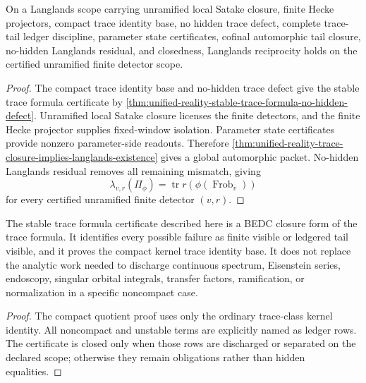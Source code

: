 \begin{theorem}
\label{thm:unified-reality-bedc-langlands-trace-closure}
On a Langlands scope carrying unramified local Satake closure, finite
Hecke projectors, compact trace identity base, no hidden trace defect,
complete trace-tail ledger discipline, parameter state certificates,
cofinal automorphic tail closure, no-hidden Langlands residual, and
closedness, Langlands reciprocity holds on the certified unramified
finite detector scope.
\end{theorem}
\begin{proof}
The compact trace identity base and no-hidden trace defect give the
stable trace formula certificate by
\autoref{thm:unified-reality-stable-trace-formula-no-hidden-defect}.
Unramified local Satake closure licenses the finite detectors, and the
finite Hecke projector supplies fixed-window isolation. Parameter state
certificates provide nonzero parameter-side readouts. Therefore
\autoref{thm:unified-reality-trace-closure-implies-langlands-existence}
gives a global automorphic packet. No-hidden Langlands residual removes
all remaining mismatch, giving
$$
\lambda_{v,r}(\Pi_\phi)
=
\operatorname{tr}r(\phi(\operatorname{Frob}_v))
$$
for every certified unramified finite detector $(v,r)$.
\end{proof}

\begin{theorem}
\label{thm:unified-reality-stable-trace-certificate-boundary}
The stable trace formula certificate described here is a BEDC closure
form of the trace formula. It identifies every possible failure as
finite visible or ledgered tail visible, and it proves the compact
kernel trace identity base. It does not replace the analytic work needed
to discharge continuous spectrum, Eisenstein series, endoscopy, singular
orbital integrals, transfer factors, ramification, or normalization in a
specific noncompact case.
\end{theorem}
\begin{proof}
The compact quotient proof uses only the ordinary trace-class kernel
identity. All noncompact and unstable terms are explicitly named as
ledger rows. The certificate is closed only when those rows are
discharged or separated on the declared scope; otherwise they remain
obligations rather than hidden equalities.
\end{proof}

